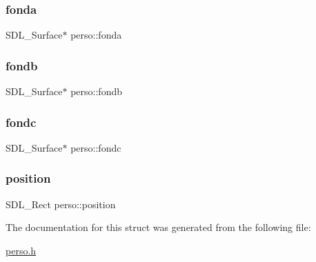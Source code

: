\subsubsection{\texorpdfstring{fonda}{fonda}}
{\footnotesize\ttfamily S\+D\+L\+\_\+\+Surface$\ast$ perso\+::fonda}

\mbox{\label{structperso_a436b5abedfc6ba00785a3cf4ff6bc32c}} 
\subsubsection{\texorpdfstring{fondb}{fondb}}
{\footnotesize\ttfamily S\+D\+L\+\_\+\+Surface$\ast$ perso\+::fondb}

\mbox{\label{structperso_ac022be57eda44dffb7cd61238105d829}} 
\subsubsection{\texorpdfstring{fondc}{fondc}}
{\footnotesize\ttfamily S\+D\+L\+\_\+\+Surface$\ast$ perso\+::fondc}

\mbox{\label{structperso_a74aed265eb926987cf218b19d163c746}} 
\subsubsection{\texorpdfstring{position}{position}}
{\footnotesize\ttfamily S\+D\+L\+\_\+\+Rect perso\+::position}



The documentation for this struct was generated from the following file\+:\begin{DoxyCompactItemize}
\item 
\hyperlink{perso_8h}{perso.\+h}\end{DoxyCompactItemize}
